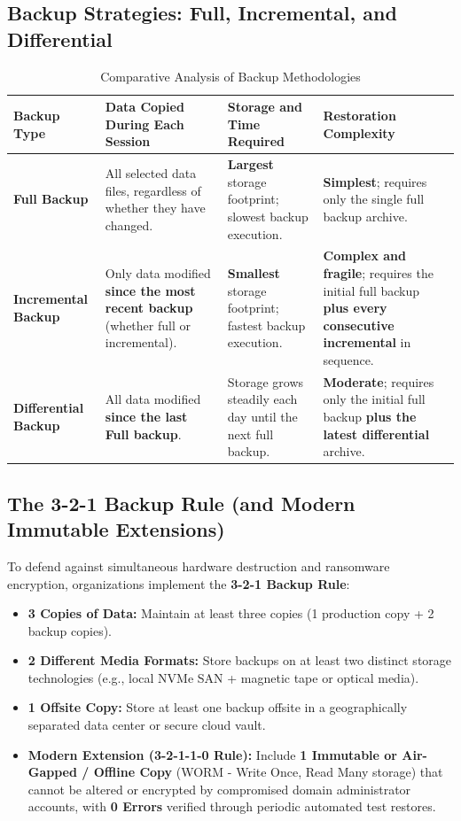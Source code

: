 \subsection{Backup Strategies: Full, Incremental, and Differential}

\begin{table}[htbp]
\centering
\caption{Comparative Analysis of Backup Methodologies}
\label{tab:backup_types}
\begin{tabularx}{\textwidth}{p{2.8cm} X X X}
\toprule
\textbf{Backup Type} & \textbf{Data Copied During Each Session} & \textbf{Storage and Time Required} & \textbf{Restoration Complexity} \\
\midrule
\textbf{Full Backup} & All selected data files, regardless of whether they have changed. & \textbf{Largest} storage footprint; slowest backup execution. & \textbf{Simplest}; requires only the single full backup archive. \\
\textbf{Incremental Backup} & Only data modified \textbf{since the most recent backup} (whether full or incremental). & \textbf{Smallest} storage footprint; fastest backup execution. & \textbf{Complex and fragile}; requires the initial full backup \textbf{plus every consecutive incremental} in sequence. \\
\textbf{Differential Backup} & All data modified \textbf{since the last Full backup}. & Storage grows steadily each day until the next full backup. & \textbf{Moderate}; requires only the initial full backup \textbf{plus the latest differential} archive. \\
\bottomrule
\end{tabularx}
\end{table}

\subsection{The 3-2-1 Backup Rule (and Modern Immutable Extensions)}

To defend against simultaneous hardware destruction and ransomware encryption, organizations implement the \textbf{3-2-1 Backup Rule}:
\begin{itemize}
\item \textbf{3 Copies of Data:} Maintain at least three copies (1 production copy + 2 backup copies).
\item \textbf{2 Different Media Formats:} Store backups on at least two distinct storage technologies (e.g., local NVMe SAN + magnetic tape or optical media).
\item \textbf{1 Offsite Copy:} Store at least one backup offsite in a geographically separated data center or secure cloud vault.
\item \textbf{Modern Extension (3-2-1-1-0 Rule):} Include \textbf{1 Immutable or Air-Gapped / Offline Copy} (WORM - Write Once, Read Many storage) that cannot be altered or encrypted by compromised domain administrator accounts, with \textbf{0 Errors} verified through periodic automated test restores.
\end{itemize}

